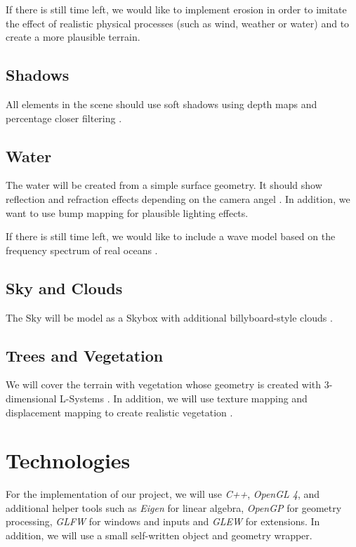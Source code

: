 \documentclass[11pt,a4paper]{article}
\begin{document}
If there is still time left, we would like to implement erosion \cite{olsen04} in order to imitate the effect of realistic physical processes (such as wind, weather or water) and to create a more plausible terrain.

\subsection{Shadows}

All elements in the scene should use soft shadows using depth maps \cite{segal92} and percentage closer filtering \cite{reeves87}.

\subsection{Water}

The water will be created from a simple surface geometry. It should show reflection and refraction effects depending on the camera angel \cite{water-tutorial}. In addition, we want to use bump mapping for plausible lighting \cite{ebert03} effects. 

If there is still time left, we would like to include a wave model based on the frequency spectrum of real oceans \cite{tessendorf01}.

\subsection{Sky and Clouds}

The Sky will be model as a Skybox \cite{skybox} with additional billyboard-style clouds \cite{moeller08}.

\subsection{Trees and Vegetation}

We will cover the terrain with vegetation whose geometry is created with 3-dimensional L-Systems \cite{ebert03}. In addition, we will use texture mapping and displacement mapping to create realistic vegetation \cite{shirly09}.

\section{Technologies}

For the implementation of our project, we will use \textit{C++}, \textit{OpenGL 4}, and additional helper tools such as \textit{Eigen} for linear algebra, \textit{OpenGP} for geometry processing, \textit{GLFW} for windows and inputs and \textit{GLEW} for extensions. In addition, we will use a small self-written object and geometry wrapper.
\end{document}
